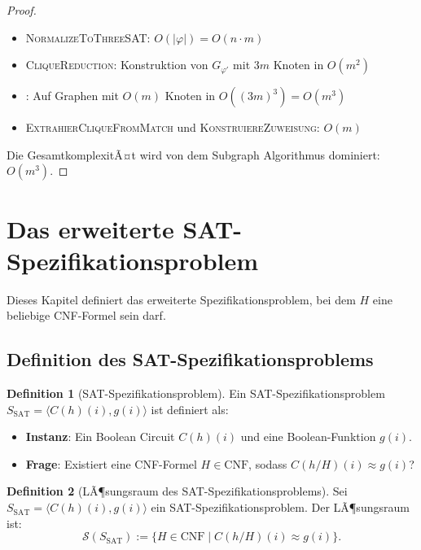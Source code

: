 ﻿\documentclass[a4paper,12pt]{article}
\theoremstyle{definition}
\newtheorem{definition}{Definition}
\begin{document}
\begin{proof}
    \begin{itemize}
        \item[-] \textsc{NormalizeToThreeSAT}: $O(|\varphi|) = O(n \cdot m)$
        \item[-] \textsc{CliqueReduction}: Konstruktion von $G_{\varphi'}$ mit $3m$ Knoten in $O(m^2)$
        \item[-] : Auf Graphen mit $O(m)$ Knoten in $O((3m)^3) = O(m^3)$
        \item[-] \textsc{ExtrahierCliqueFromMatch} und \textsc{KonstruiereZuweisung}: $O(m)$
    \end{itemize}
    Die GesamtkomplexitÃ¤t wird von dem Subgraph Algorithmus dominiert: $O(m^3)$.
\end{proof}

\section{Das erweiterte SAT-Spezifikationsproblem}

Dieses Kapitel definiert das erweiterte Spezifikationsproblem, bei dem $H$ eine beliebige CNF-Formel sein darf.

\subsection{Definition des SAT-Spezifikationsproblems}

\begin{definition}[SAT-Spezifikationsproblem]
    Ein SAT-Spezifikationsproblem $S_{\text{SAT}} = \langle C(h)(i), g(i) \rangle$ ist definiert als:
    \begin{itemize}
        \item \textbf{Instanz}: Ein Boolean Circuit $C(h)(i)$ und eine Boolean-Funktion $g(i)$.
        \item \textbf{Frage}: Existiert eine CNF-Formel $H \in \text{CNF}$, sodass $C(h/H)(i) \approx g(i)$?
    \end{itemize}
\end{definition}

\begin{definition}[LÃ¶sungsraum des SAT-Spezifikationsproblems]
    Sei $S_{\text{SAT}} = \langle C(h)(i), g(i) \rangle$ ein SAT-Spezifikationsproblem. Der LÃ¶sungsraum ist:
    \[
    \mathcal{S}(S_{\text{SAT}}) := \{ H \in \text{CNF} \mid C(h/H)(i) \approx g(i) \}.
    \]
\end{definition}
\end{document}
